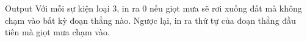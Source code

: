 Output
Với mỗi sự kiện loại 3, in ra 0 nếu giọt mưa sẽ rơi xuống đất mà không chạm vào bất kỳ đoạn thẳng nào. Ngược lại, in ra thứ tự của đoạn thẳng đầu tiên mà giọt mưa chạm vào.